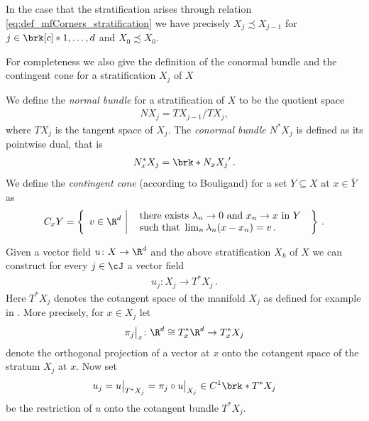 In the case that the stratification arises through relation \eqref{eq:def_mfCorners_stratification}
we have precisely $X_{j}\precsim X_{j-1}$ for $j\in\brk[c]*{1,\dots,d}$ and $X_0\precsim X_0$.

For completeness we also give the definition of the conormal bundle and the contingent cone for a 
stratification $X_j$ of $X$
\begin{definition}
  We define the \emph{normal bundle} for a stratification of $X$ to be the quotient space
  \begin{align}
    NX_j=TX_{j-1}/TX_j,
  \end{align}
  where $TX_j$ is the tangent space of $X_j$.
  The \emph{conormal bundle} $N^*X_j$ is defined as its pointwise dual, that is
  \begin{align*}
    N_x^*X_j=\brk*{N_xX_j}'\,.
  \end{align*}
  We define the \emph{contingent cone} (according to Bouligand) for a set $Y\subseteq X$ at $x\in\overline{Y}$ as
  \begin{align}
    C_xY=\left\{\begin{array}{l|l}
      v\in\R^d & \begin{array}{l}
        \text{ there exists }\lambda_n\to0\text{ and }x_n\to x \text{ in }Y \\
        \text{ such that }\lim_n\lambda_n(x-x_n)=v\,.
      \end{array}
    \end{array}\right\}\,.
  \end{align}
\end{definition}

Given a vector field $u\colon X\to\R^d$ and the above stratification $X_k$ of $X$ we can construct for every
$j\in\cJ$ a vector field
\begin{align*}
  u_j\colon X_j\to T^*X_j\,.
\end{align*}
Here $T^*X_j$ denotes the cotangent space of the manifold $X_j$ as defined for example in \cite[Chapter 6]{Hirsch1994}.
More precisely, for $x\in X_j$ let
\begin{align}
  \pi_j\big\vert_x\colon\R^d\cong T_x^*\R^d\to T_x^*X_{j}\label{eq:def_projectionStratification}
\end{align}
denote the orthogonal projection of a vector at $x$ onto the cotangent space of the stratum $X_j$ at $x$.
Now set
\begin{align}
  u_j=u\big\vert_{T^*X_j}=\pi_j\circ u\big\vert_{X_j}\in C^1\brk*{T^*X_j}\label{eq:def_projectionUStratification}
\end{align}
be the restriction of $u$ onto the cotangent bundle $T^*X_j$.


